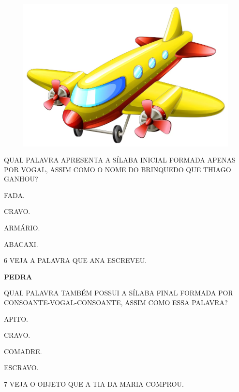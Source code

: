 \begin{figure}[H]
\centering
\includegraphics[width=.7\textwidth]{./media/image239.png}
\end{figure}

QUAL PALAVRA APRESENTA A SÍLABA INICIAL FORMADA APENAS POR VOGAL, ASSIM COMO O NOME DO BRINQUEDO QUE THIAGO GANHOU?

\begin{escolha}

\item FADA.

\item CRAVO.

\item ARMÁRIO.

\item ABACAXI.

\end{escolha}

\num{6} VEJA A PALAVRA QUE ANA ESCREVEU.

\begin{center}
\textbf{PEDRA}
\end{center}

QUAL PALAVRA TAMBÉM POSSUI A SÍLABA FINAL FORMADA POR CONSOANTE-VOGAL-CONSOANTE, ASSIM COMO ESSA PALAVRA?

\begin{escolha}

\item APITO.

\item CRAVO.

\item COMADRE. 

\item ESCRAVO.

\end{escolha}

\num{7} VEJA O OBJETO QUE A TIA DA MARIA COMPROU.

